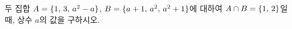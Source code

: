 두 집합 $A=\{1,\mkern3mu 3,\mkern3mu a^2-a\}$, $B=\{a+1,\mkern3mu a^2,\mkern3mu a^2+1\}$에 대하여 $A\cap B=\{1,\mkern3mu 2\}$일 때, 상수 $a$의 값을 구하시오.
